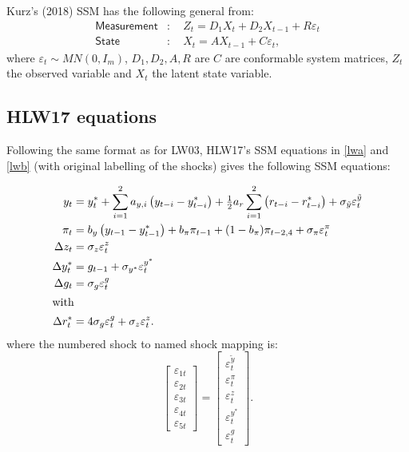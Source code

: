\documentclass[a4paper,12pt]{article}
\newcommand{\bsq}{\begin{subequations}}\newcommand{\esq}{\end{subequations}}
\newcommand{\intxt}[1]{\intertext{#1}}\newcommand{\BAW}[1]{\begin{adjustwidth}{-#1mm}{-5mm}}\newcommand{\EAW}{\end{adjustwidth}}
\begin{document}
Kurz's (2018) SSM has the following general from:\bsq\label{SSM}%
\begin{align}
\mathsf{Measurement}& :\quad Z_{t}=D_{1}X_{t}+D_{2}X_{t-1}+R\varepsilon _{t}
\label{ssm1} \\
\mathsf{State}& :\quad X_{t}=AX_{t-1}+C\varepsilon _{t},  \label{ssm2}
\end{align}%
\esq where $\varepsilon _{t}\sim MN(0,I_{m})$, $D_{1},D_{2},A,R$ are $C$ are
conformable system matrices, $Z_{t}$ the observed variable and $X_{t}$ the
latent state variable.

\subsection{HLW17 equations}

Following the same format as for LW03, HLW17's SSM equations in \ref{lwa}
and \ref{lwb} (with original labelling of the shocks) gives the following
SSM equations:

\pagebreak \bsq\label{LW03}%
\begin{align}
y_{t}& =y_{t}^{\ast }+\sum_{i=1}^{2}a_{y,i}\left( y_{t-i}-y_{t-i}^{\ast
}\right) +\tfrac{1}{2}a_{r}\sum_{i=1}^{2}\left( r_{t-i}-r_{t-i}^{\ast
}\right) +\sigma _{\tilde{y}}\varepsilon _{t}^{\tilde{y}}  \label{LW03a} \\
\pi _{t}& =b_{y}\left( y_{t-1}-y_{t-1}^{\ast }\right) +b_{\pi }\pi
_{t-1}+(1-b_{\pi })\pi _{t-2,4}+\sigma _{\pi }\varepsilon _{t}^{\pi } \\
\Delta z_{t}& =\sigma _{z}\varepsilon _{t}^{z}  \label{LW03c} \\
\Delta y_{t}^{\ast }& =g_{t-1}+\sigma _{y^{\ast }}\varepsilon _{t}^{y^{\ast
}}  \label{LW03d} \\
\Delta g_{t}& =\sigma _{g}\varepsilon _{t}^{g}  \label{LW03e} \\
\intxt{with}\Delta r_{t}^{\ast }& =4\sigma _{g}\varepsilon _{t}^{g}+\sigma
_{z}\varepsilon _{t}^{z}.  \label{LW03f}
\end{align}%
\esq where the numbered shock to named shock mapping is:%
\begin{equation}
\begin{bmatrix}
\varepsilon _{1t} \\ 
\varepsilon _{2t} \\ 
\varepsilon _{3t} \\ 
\varepsilon _{4t} \\ 
\varepsilon _{5t}%
\end{bmatrix}%
=%
\begin{bmatrix}
\varepsilon _{t}^{\tilde{y}} \\ 
\varepsilon _{t}^{\pi } \\ 
\varepsilon _{t}^{z} \\ 
\varepsilon _{t}^{y^{\ast }} \\ 
\varepsilon _{t}^{g}%
\end{bmatrix}%
.
\end{equation}
\end{document}

